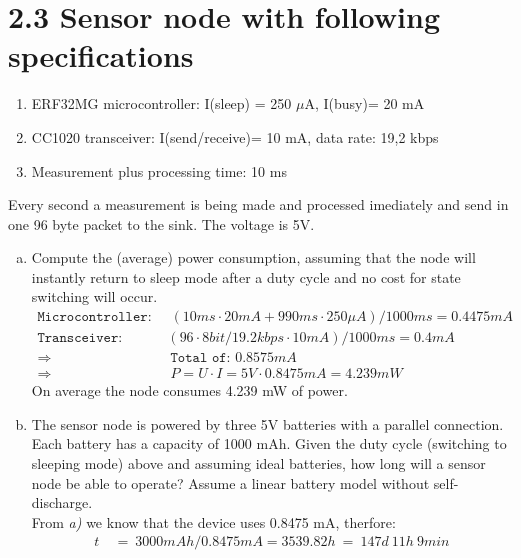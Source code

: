 \documentclass{article}
\begin{document}
	\section*{2.3 Sensor node with following specifications}
	\begin{adjustwidth}{2em}{2em}
		\begin{enumerate}[]
			\item ERF32MG microcontroller: I(sleep) = 250 $\mu$A, I(busy)= 20 mA
			\item CC1020 transceiver: I(send/receive)= 10 mA, data rate: 19,2 kbps
			\item Measurement plus processing time: 10 ms
		\end{enumerate}
		\noindent Every second a measurement is being made and processed imediately and send in one 96 byte packet to the sink. The voltage is 5V.
		\begin{enumerate}[a)]
			\item Compute the (average) power consumption, assuming that the node will instantly return to sleep mode after a duty cycle and no cost for state switching will occur.
			\begin{align*}
				\texttt{Microcontroller: } & \ (10 ms \cdot 20mA + 990ms \cdot 250 \mu A) / 1000 ms = 0.4475 mA \\
				\texttt{Transceiver: } & (96 \cdot 8bit / 19.2 kbps \cdot 10mA ) / 1000ms = 0.4 mA \\
				\Rightarrow \ & \ \texttt{Total of: } 0.8575 mA \\
				\Rightarrow \ & \ P = U \cdot I = 5V \cdot 0.8475 mA = 4.239 mW
			\end{align*}
			On average the node consumes 4.239 mW of power.
			\item The sensor node is powered by three 5V batteries with a parallel connection. Each battery has a capacity of 1000 mAh. Given the duty cycle (switching to sleeping mode) above and assuming ideal batteries, how long will a sensor node be able to operate? Assume a linear battery model without self-discharge. \\
			From \textit{a)} we know that the device uses 0.8475 mA, therfore:
			\begin{align*}
				t \ & = \ 3000 mAh / 0.8475 mA = 3539.82 h \ = \ 147 d \ 11h \ 9 min
			\end{align*}
		\end{enumerate}
	\end{adjustwidth}
\end{document}
